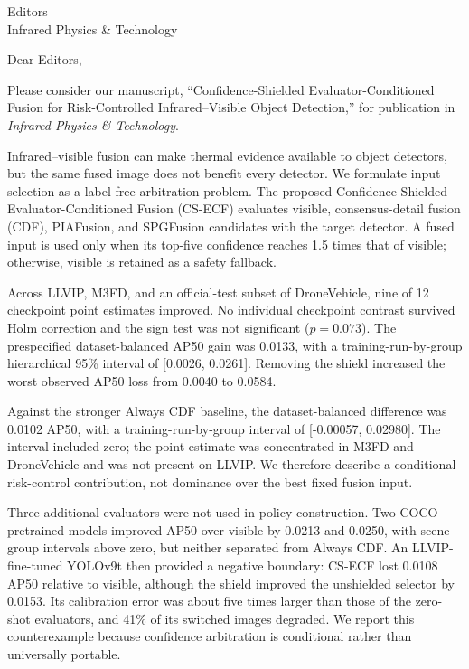 \documentclass[a4paper,10pt]{letter}
\begin{document}
\sloppy
\begin{letter}{Editors\\Infrared Physics \& Technology}
\opening{Dear Editors,}

Please consider our manuscript, ``Confidence-Shielded
Evaluator-Conditioned Fusion for Risk-Controlled Infrared--Visible Object
Detection,'' for publication in \emph{Infrared Physics \& Technology}.

Infrared--visible fusion can make thermal evidence available to object
detectors, but the same fused image does not benefit every detector. We
formulate input selection as a label-free arbitration problem. The proposed
Confidence-Shielded Evaluator-Conditioned Fusion (CS-ECF) evaluates visible,
consensus-detail fusion (CDF), PIAFusion, and SPGFusion candidates with the
target detector. A fused input is used only when its top-five confidence reaches
1.5 times that of visible; otherwise, visible is retained as a safety fallback.

Across LLVIP, M3FD, and an official-test subset of DroneVehicle, nine of 12
checkpoint point estimates improved. No individual checkpoint contrast
survived Holm correction and the sign test was not significant (\(p=0.073\)).
The prespecified dataset-balanced AP50 gain was 0.0133, with a
training-run-by-group hierarchical 95\% interval of [0.0026, 0.0261].
Removing the shield increased the worst observed AP50 loss from 0.0040 to
0.0584.

Against the stronger Always CDF baseline, the dataset-balanced difference was
0.0102 AP50, with a training-run-by-group interval of [-0.00057, 0.02980].
The interval included zero; the point estimate was concentrated in M3FD and
DroneVehicle and was not present on LLVIP. We therefore describe a
conditional risk-control contribution, not dominance over the best fixed fusion
input.

Three additional evaluators were not used in policy construction. Two
COCO-pretrained models improved AP50 over visible by 0.0213 and 0.0250, with
scene-group intervals above zero, but neither separated from Always CDF. An
LLVIP-fine-tuned YOLOv9t then provided a negative boundary: CS-ECF lost 0.0108
AP50 relative to visible, although the shield improved the unshielded selector
by 0.0153. Its calibration error was about five times larger than those of the
zero-shot evaluators, and 41\% of its switched images degraded. We report this
counterexample because confidence arbitration is conditional rather than
universally portable.


\end{letter}
\end{document}

